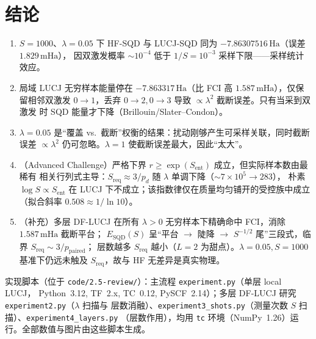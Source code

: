 \documentclass[11pt,a4paper]{article}
\newcommand{\Ha}{\,\text{Ha}}
\newcommand{\mHa}{\,\text{mHa}}
\begin{document}
\section{结论}
\begin{enumerate}[leftmargin=*]
  \item $S=1000$、$\lambda=0.05$ 下 HF-SQD 与 LUCJ-SQD 同为 $-7.86307516\Ha$（误差 $1.829\mHa$），
  因双激发概率 $\sim\!10^{-4}$ 低于 $1/S=10^{-3}$ 采样下限——采样统计效应。
  \item 局域 LUCJ 无穷样本能量停在 $-7.863317\Ha$（比 FCI 高 $1.587\mHa$），仅保留相邻双激发
  $0\!\to\!1$，丢弃 $0\!\to\!2,0\!\to\!3$ 导致 $\propto\!\lambda^2$ 截断误差。只有当采到双激发
  时 SQD 能量才下降（Brillouin/Slater--Condon）。
  \item $\lambda=0.05$ 是“覆盖 vs.\ 截断”权衡的结果：扰动刚够产生可采样关联，同时截断误差
  $\propto\!\lambda^2$ 仍可忽略。$\lambda=1$ 使截断误差最大，因此“太大”。
  \item （Advanced Challenge）严格下界 $r\ge\exp(S_{\mathrm{ent}})$ 成立，但实际样本数由最稀有
  相关行列式主导：$S_{\mathrm{req}}\approx3/p_d$ 随 $\lambda$ 单调下降（$\sim\!7\!\times\!10^5\to283$），
  朴素 $\log S\propto S_{\mathrm{ent}}$ 在 LUCJ 下不成立；该指数律仅在质量均匀铺开的受控族中成立
  （拟合斜率 $0.508\approx1/\ln10$）。
  \item （补充）多层 DF-LUCJ 在所有 $\lambda>0$ 无穷样本下精确命中 FCI，消除 $1.587\mHa$ 截断平台；
  $E_{\mathrm{SQD}}(S)$ 呈“平台 $\to$ 陡降 $\to$ $S^{-1/2}$ 尾”三段式，临界 $S_{\mathrm{req}}\sim3/p_{\mathrm{paired}}$；
  层数越多 $S_{\mathrm{req}}$ 越小（$L=2$ 为甜点）。$\lambda=0.05,S=1000$ 基准下仍远未触及
  $S_{\mathrm{req}}$，故与 HF 无差异是真实物理。
\end{enumerate}

\vspace{4pt}
{\small 实现脚本（位于 \texttt{code/2.5-review/}）：主流程 \texttt{experiment.py}（单层 local LUCJ，
Python~3.12, TF~2.x, TC~0.12, PySCF~2.14）；多层 DF-LUCJ 研究 \texttt{experiment2.py}（$\lambda$ 扫描与
层数消融）、\texttt{experiment3\_shots.py}（测量次数 $S$ 扫描）、\texttt{experiment4\_layers.py}
（层数作用），均用 \texttt{tc} 环境（NumPy~1.26）运行。全部数值与图片由这些脚本生成。}
\end{document}
